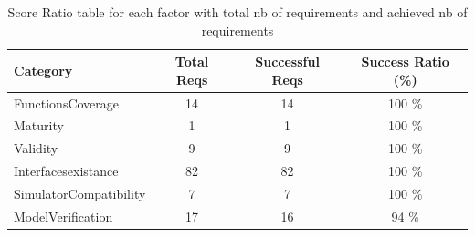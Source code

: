 \documentclass{article}
\begin{document}
						\begin{table}
						\centering
						\caption{Score Ratio table for each factor with total nb of requirements and achieved nb of requirements}
						\begin{tabular}{|l|c|c|c|}
						\hline
						Category & Total Reqs & Successful Reqs & Success Ratio (\%) \\
						\hline

							    FunctionsCoverage & 14 & 14 & 100 \% \\
							 

							    Maturity & 1 & 1 & 100 \% \\
							 

							    Validity & 9 & 9 & 100 \% \\
							 

							    Interfacesexistance & 82 & 82 & 100 \% \\
							 

							    SimulatorCompatibility & 7 & 7 & 100 \% \\
							 

							    ModelVerification & 17 & 16 & 94 \% \\
							 
					
						
						\hline
						\end{tabular}
						\end{table}




										
								

			
\end{document}
